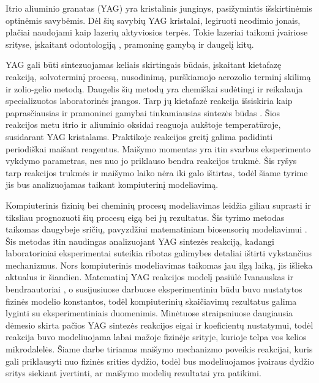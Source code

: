 
Itrio aliuminio granatas (YAG) yra kristalinis junginys, pasižymintis išskirtinėmis optinėmis savybėmis. Dėl šių savybių YAG kristalai, legiruoti neodimio jonais, plačiai naudojami kaip lazerių aktyviosios terpės. Tokie lazeriai taikomi įvairiose srityse, įskaitant odontologiją \cite{valentiUseErYAG2021}, pramoninę gamybą \cite{dubeyExperimentalStudyNd2008} ir daugelį kitų.

YAG gali būti sintezuojamas keliais skirtingais būdais, įskaitant kietafazę reakciją, solvoterminį procesą, nusodinimą, purškiamojo aerozolio terminį skilimą ir zolio-gelio metodą. Daugelis šių metodų yra chemiškai sudėtingi ir reikalauja specializuotos laboratorinės įrangos. Tarp jų kietafazė reakcija išsiskiria kaip paprasčiausias ir pramoninei gamybai tinkamiausias sintezės būdas \cite{zhangNovelSynthesisYAG2005}. Šios reakcijos metu itrio ir aliuminio oksidai reaguoja aukštoje temperatūroje, susidarant YAG kristalams. Praktikoje reakcijos greitį galima padidinti periodiškai maišant reagentus. Maišymo momentas yra itin svarbus eksperimento vykdymo parametras, nes nuo jo priklauso bendra reakcijos trukmė. Šis ryšys tarp reakcijos trukmės ir maišymo laiko nėra iki galo ištirtas, todėl šiame tyrime jis bus analizuojamas taikant kompiuterinį modeliavimą.

Kompiuterinis fizinių bei cheminių procesų modeliavimas leidžia giliau suprasti ir tiksliau prognozuoti šių procesų eigą bei jų rezultatus. Šis tyrimo metodas taikomas daugybeje sričių, pavyzdžiui matematiniam biosensorių modeliavimui \cite{baronasNonlinearEffectsDiffusion2017, baronasNonlinearEffectsPartitioning2024}. Šis metodas itin naudingas analizuojant YAG sintezės reakciją, kadangi laboratoriniai eksperimentai suteikia ribotas galimybes detaliai ištirti vykstančius mechanizmus. Nors kompiuterinis modeliavimas taikomas jau ilgą laiką, jis išlieka aktualus ir šiandien. Matematinį YAG reakcijos modelį pasiūlė Ivanauskas ir bendraautoriai \cite{ivanauskasModellingSolidState2005}, o susijusiuose darbuose \cite{ivanauskasComputationalModellingYAG2009,mackeviciusCloserLookComputer2012} eksperimentiniu būdu buvo nustatytos fizinės modelio konstantos, todėl kompiuterinių skaičiavimų rezultatus galima lyginti su eksperimentiniais duomenimis. Minėtuose straipsniuose daugiausia dėmesio skirta pačios YAG sintezės reakcijos eigai ir koeficientų nustatymui, todėl reakcija buvo modeliuojama labai mažoje fizinėje srityje, kurioje telpa vos kelios mikrodalelės. Šiame darbe tiriamas maišymo mechanizmo poveikis reakcijai, kuris gali priklausyti nuo fizinės srities dydžio, todėl bus modeliuojamos įvairaus dydžio sritys siekiant įvertinti, ar maišymo modelių rezultatai yra patikimi.

